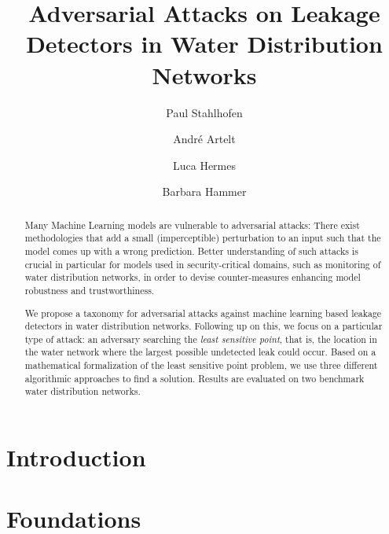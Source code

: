 \documentclass[runningheads]{llncs}
\begin{document}
\title{Adversarial Attacks on Leakage Detectors in Water Distribution Networks}
%
%
\author{Paul Stahlhofen \and
Andr\'e Artelt \and
Luca Hermes \and
Barbara Hammer}
%
%
%
\maketitle              %
%
\begin{abstract}
Many Machine Learning models are vulnerable to adversarial attacks: There
exist methodologies that add a small (imperceptible) perturbation to an input such that the model comes up with a wrong prediction. Better understanding of such attacks is crucial in
particular for models used in security-critical domains, such as monitoring of water distribution networks, in order to devise
counter-measures enhancing model robustness and trustworthiness.

We propose a taxonomy for adversarial attacks against machine learning based leakage detectors in water distribution networks. Following up on this, we focus on a particular type of attack: an adversary searching the
\textit{least sensitive point}, that is, the location in the water network where the
largest possible undetected leak could occur. Based on a mathematical
formalization of the least sensitive point problem, we use three different
algorithmic approaches to find a solution. Results are evaluated on two
benchmark water distribution networks.
\end{abstract}
%
%
%
\section{Introduction} %

\section{Foundations}
\label{sec:foundations}
\end{document}

